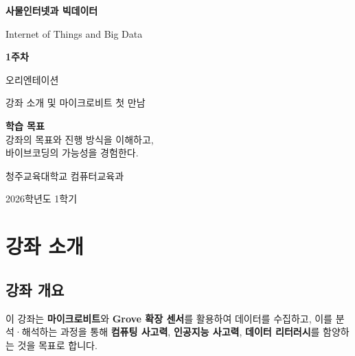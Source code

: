\documentclass[11pt, a4paper]{article}
\begin{document}
\begin{titlepage}
\centering
\vspace*{2cm}

{\Huge\bfseries\color{NavyBlue} 사물인터넷과 빅데이터}

\vspace{0.5cm}
{\Large Internet of Things and Big Data}

\vspace{2cm}

{\LARGE\bfseries 1주차}

\vspace{0.5cm}

{\Huge 오리엔테이션}

\vspace{1cm}

{\large 강좌 소개 및 마이크로비트 첫 만남}

\vspace{3cm}

\begin{info}
\centering
\textbf{학습 목표}\\[0.5em]
강좌의 목표와 진행 방식을 이해하고,\\
바이브코딩의 가능성을 경험한다.
\end{info}

\vfill

{\large 청주교육대학교 컴퓨터교육과}

\vspace{0.5cm}

{\large 2026학년도 1학기}

\end{titlepage}

\tableofcontents
\newpage

\section{강좌 소개}

\subsection{강좌 개요}

이 강좌는 \textbf{마이크로비트}와 \textbf{Grove 확장 센서}를 활용하여 데이터를 수집하고, 이를 분석·해석하는 과정을 통해 \textbf{컴퓨팅 사고력}, \textbf{인공지능 사고력}, \textbf{데이터 리터러시}를 함양하는 것을 목표로 합니다.
\end{document}
